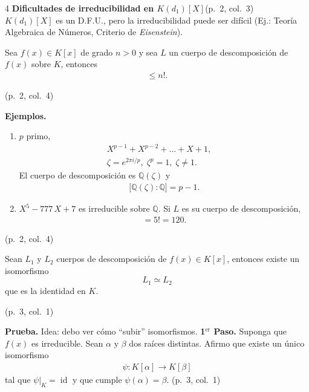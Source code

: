 \documentclass[landscape,a4paper]{article}
\begin{document}
\begin{multicols}{4}
\noindent\textbf{Dificultades de irreducibilidad en $K(d_1)[X]$}\hfill(p.~2, col.~3)\\
$K(d_{1})[X]$ es un D.F.U., pero la irreducibilidad puede ser difícil  
(Ej.: Teoría Algebraica de Números, Criterio de \textit{Eisenstein}).  
\begin{tcolorbox}[title={Proposición},colback=white,
                 colframe=brown!80!black,colbacktitle=brown!80!black,coltitle=white]
Sea $f(x)\in K[x]$ de grado $n>0$ y sea $L$ un cuerpo de descomposición de $f(x)$ sobre $K$, entonces
\begin{align*}
[L:K]\le n!.
\end{align*}
\end{tcolorbox}\hfill(p.~2, col.~4)

\noindent\textbf{Ejemplos.}
\begin{enumerate}\itemsep2pt
\item[$1)$] $p$ primo,\;
\begin{align*}
&X^{p-1}+X^{p-2}+\dots+X+1,\qquad \\
&\zeta=e^{2\pi i/p},\;\zeta^{p}=1,\;\zeta\neq1.
\end{align*}
El cuerpo de descomposición es $\mathbb{Q}(\zeta)$ y
\begin{align*}
\bigl[\mathbb{Q}(\zeta):\mathbb{Q}\bigr]=p-1.
\end{align*}
\item[$2)$] $X^{5}-777\,X+7$ es irreducible sobre $\mathbb{Q}$.  
Si $L$ es su cuerpo de descomposición,
\begin{align*}
[L:\mathbb{Q}]=5!=120.
\end{align*}
\end{enumerate}
(p.~2, col.~4)
\begin{tcolorbox}[title={Proposición: Unicidad del cuerpo de descomposición},colback=white,
                 colframe=brown!80!black,colbacktitle=brown!80!black,coltitle=white]
Sean $L_{1}$ y $L_{2}$ cuerpos de descomposición de $f(x)\in K[x]$, entonces existe un isomorfismo 
\[
L_{1}\simeq L_{2}
\]
que es la identidad en $K$.
\end{tcolorbox}\hfill(p.~3, col.~1)

\noindent\textbf{Prueba.} Idea: debo ver cómo “subir” isomorfismos.
\medskip
\textbf{1$^{\mathrm{er}}$ Paso.} Suponga que $f(x)$ es irreducible. Sean $\alpha$ y $\beta$ dos raíces distintas.  
Afirmo que existe un único isomorfismo
\begin{align*}
\psi:K[\alpha]\longrightarrow K[\beta]
\end{align*}
tal que $\psi|_{K}=\operatorname{id}$ y que cumple $\boxed{\psi(\alpha)=\beta}$. (p.~3, col.~1)


\end{multicols}
\end{document}

